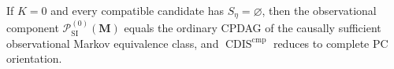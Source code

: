 If \(K=0\) and every compatible candidate has \(S_\eta=\varnothing\), then the observational component \(\mathcal P_{\mathrm{SI}}^{(0)}(\mathbf M)\) equals the ordinary CPDAG of the causally sufficient observational Markov equivalence class, and \(\operatorname{CDIS}^{\mathrm{cmp}}\) reduces to complete PC orientation.